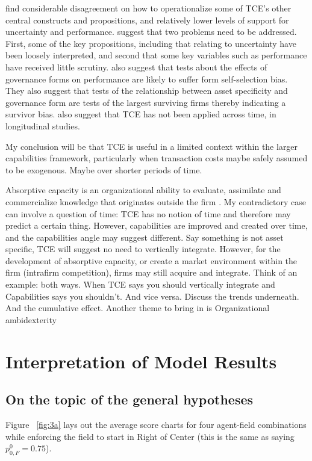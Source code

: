 \documentclass[12pt,letterpaper]{article}
\begin{document}
\cite{David2004} find considerable disagreement on how to operationalize some of TCE's other central constructs and propositions, and relatively lower levels of support for uncertainty and performance. \cite{David2004} suggest that two problems need to be addressed. First, some of the key propositions, including that relating to uncertainty have been loosely interpreted, and second that some key variables such as performance have received little scrutiny. \cite{David2004} also suggest that tests about the effects of governance forms on performance are likely to suffer form self-selection bias. They also suggest that tests of the relationship between asset specificity and governance form are tests of the largest surviving firms thereby indicating a survivor bias. \cite{David2004} also suggest that TCE has not been applied across time, in longitudinal studies. 

My conclusion will be that TCE is useful in a limited context within the larger capabilities framework, particularly when transaction costs maybe safely assumed to be exogenous. Maybe over shorter periods of time.

Absorptive capacity is an organizational ability to evaluate, assimilate and commercialize knowledge that originates outside the firm \citep{Cohen1990}.
My contradictory case can involve a question of time: TCE has no notion of time and therefore may predict a certain thing. However, capabilities are improved and created over time, and the capabilities angle may suggest different. Say something is not asset specific, TCE will suggest no need to vertically integrate. However, for the development of absorptive capacity, or create a market environment within the firm (intrafirm competition), firms may still acquire and integrate. Think of an example: both ways. When TCE says you should vertically integrate and Capabilities says you shouldn't. And vice versa. Discuss the trends underneath. And the cumulative effect. Another theme to bring in is Organizational ambidexterity \citep{Raisch2008}

\section{Interpretation of Model Results}
\subsection{On the topic of the general hypotheses}
 Figure ~\ref{fig:3a} lays out the average score charts for four agent-field combinations while enforcing the field to start in Right of Center (this is the same as saying $p_{0,F}^0 = 0.75$). 
\end{document}
